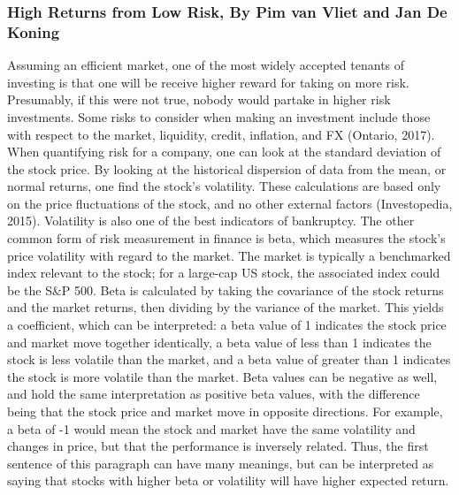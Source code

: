 \documentclass[12pt,twoside]{reedthesis}
\theoremstyle{definition}
\theoremstyle{definition}
\theoremstyle{definition}
\theoremstyle{remark}
\begin{document}
\subsubsection{High Returns from Low Risk, By Pim van Vliet and Jan De
Koning}\label{high-returns-from-low-risk-by-pim-van-vliet-and-jan-de-koning}

Assuming an efficient market, one of the most widely accepted tenants of
investing is that one will be receive higher reward for taking on more
risk. Presumably, if this were not true, nobody would partake in higher
risk investments. Some risks to consider when making an investment
include those with respect to the market, liquidity, credit, inflation,
and FX (Ontario, 2017). When quantifying risk for a company, one can
look at the standard deviation of the stock price. By looking at the
historical dispersion of data from the mean, or normal returns, one find
the stock's volatility. These calculations are based only on the price
fluctuations of the stock, and no other external factors (Investopedia,
2015). Volatility is also one of the best indicators of bankruptcy. The
other common form of risk measurement in finance is beta, which measures
the stock's price volatility with regard to the market. The market is
typically a benchmarked index relevant to the stock; for a large-cap US
stock, the associated index could be the S\&P 500. Beta is calculated by
taking the covariance of the stock returns and the market returns, then
dividing by the variance of the market. This yields a coefficient, which
can be interpreted: a beta value of 1 indicates the stock price and
market move together identically, a beta value of less than 1 indicates
the stock is less volatile than the market, and a beta value of greater
than 1 indicates the stock is more volatile than the market. Beta values
can be negative as well, and hold the same interpretation as positive
beta values, with the difference being that the stock price and market
move in opposite directions. For example, a beta of -1 would mean the
stock and market have the same volatility and changes in price, but that
the performance is inversely related. Thus, the first sentence of this
paragraph can have many meanings, but can be interpreted as saying that
stocks with higher beta or volatility will have higher expected return.
\end{document}
